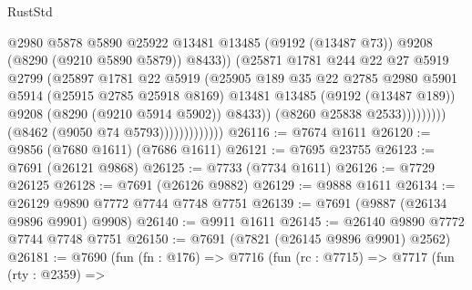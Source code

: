 \begin{lexlean}{RustStd}
\begin{coremodule}
                                            @2980
                                            @5878
                                            @5890
                                            @25922
                                            @13481
                                            @13485
                                            (@9192 (@13487 @73))
                                            @9208
                                            (@8290 (@9210 @5890 @5879))
                                            @8433))
                                        (@25871
                                          @1781
                                          @244
                                          @22
                                          @27
                                          @5919
                                          @2799
                                          (@25897
                                            @1781
                                            @22
                                            @5919
                                            (@25905
                                              @189
                                              @35
                                              @22
                                              @2785
                                              @2980
                                              @5901
                                              @5914
                                              (@25915 @2785 @25918 @8169)
                                              @13481
                                              @13485
                                              (@9192 (@13487 @189))
                                              @9208
                                              (@8290 (@9210 @5914 @5902))
                                              @8433))
                                          (@8260 @25838 @2533)))))))))
                          (@8462 (@9050 @74 @5793)))))))))))))
@26116 := @7674 @1611
@26120 := @9856 (@7680 @1611) (@7686 @1611)
@26121 := @7695 @23755
@26123 := @7691 (@26121 @9868)
@26125 := @7733 (@7734 @1611)
@26126 := @7729 @26125
@26128 := @7691 (@26126 @9882)
@26129 := @9888 @1611
@26134 := @26129 @9890 @7772 @7744 @7748 @7751
@26139 := @7691 (@9887 (@26134 @9896 @9901) @9908)
@26140 := @9911 @1611
@26145 := @26140 @9890 @7772 @7744 @7748 @7751
@26150 := @7691 (@7821 (@26145 @9896 @9901) @2562)
@26181 := @7690
    (fun (fn : @176) =>
    @7716
      (fun (rc : @7715) =>
      @7717
        (fun (rty : @2359) =>

\end{coremodule}
\end{lexlean}
